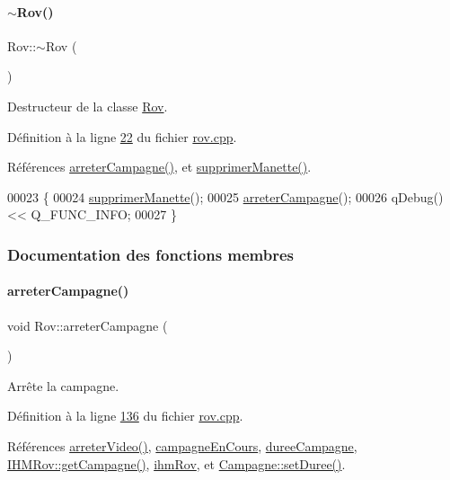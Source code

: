 \paragraph{\texorpdfstring{$\sim$\+Rov()}{~Rov()}}
{\footnotesize\ttfamily Rov\+::$\sim$\+Rov (\begin{DoxyParamCaption}{ }\end{DoxyParamCaption})}



Destructeur de la classe \hyperlink{class_rov}{Rov}. 



Définition à la ligne \hyperlink{rov_8cpp_source_l00022}{22} du fichier \hyperlink{rov_8cpp_source}{rov.\+cpp}.



Références \hyperlink{rov_8cpp_source_l00136}{arreter\+Campagne()}, et \hyperlink{rov_8cpp_source_l00117}{supprimer\+Manette()}.


\begin{DoxyCode}
00023 \{
00024     \hyperlink{class_rov_a31f810925200612a6bb4728236c695ed}{supprimerManette}();
00025     \hyperlink{class_rov_ad53e8d86817c81f92e3113b0394bedc5}{arreterCampagne}();
00026     qDebug() << Q\_FUNC\_INFO;
00027 \}
\end{DoxyCode}


\subsubsection{Documentation des fonctions membres}
\mbox{\label{class_rov_ad53e8d86817c81f92e3113b0394bedc5}} 
\paragraph{\texorpdfstring{arreter\+Campagne()}{arreterCampagne()}}
{\footnotesize\ttfamily void Rov\+::arreter\+Campagne (\begin{DoxyParamCaption}{ }\end{DoxyParamCaption})}



Arrête la campagne. 



Définition à la ligne \hyperlink{rov_8cpp_source_l00136}{136} du fichier \hyperlink{rov_8cpp_source}{rov.\+cpp}.



Références \hyperlink{rov_8cpp_source_l00263}{arreter\+Video()}, \hyperlink{rov_8h_source_l00110}{campagne\+En\+Cours}, \hyperlink{rov_8h_source_l00109}{duree\+Campagne}, \hyperlink{ihmrov_8cpp_source_l00149}{I\+H\+M\+Rov\+::get\+Campagne()}, \hyperlink{rov_8h_source_l00094}{ihm\+Rov}, et \hyperlink{campagne_8cpp_source_l00049}{Campagne\+::set\+Duree()}.



